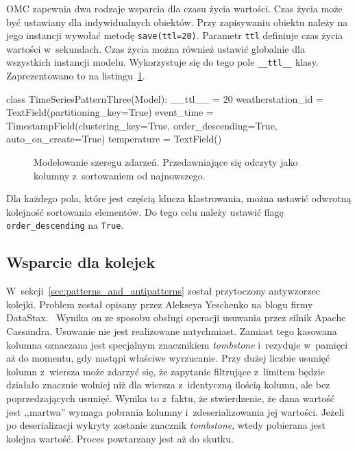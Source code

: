 OMC zapewnia dwa rodzaje wsparcia dla czasu życia wartości. Czas życia może być ustawiany dla indywidualnych obiektów. Przy zapisywaniu obiektu należy na jego instancji wywołać metodę \verb+save(ttl=20)+. Parametr \verb+ttl+ definiuje czas życia wartości w~sekundach. Czas życia można również ustawić globalnie dla wszystkich instancji modelu. Wykorzystuje się do tego pole \verb+__ttl__+ klasy. Zaprezentowano to na listingu~\ref{lst:time_series_modeling_three}.

\begin{verbbox}[\footnotesize]
class TimeSeriesPatternThree(Model):
    __ttl__ = 20
    weatherstation_id = TextField(partitioning_key=True)
    event_time = TimestampField(clustering_key=True, 
                                order_descending=True,
                                auto_on_create=True)
    temperature = TextField()
\end{verbbox}

\begin{figure}[ht!]
	\centering
	\theverbbox
	\caption{Modelowanie szeregu zdarzeń. Przedawniające się odczyty jako kolumny z~sortowaniem od najnowszego.}
	\label{lst:time_series_modeling_three}
\end{figure} 

Dla każdego pola, które jest częścią klucza klastrowania, można ustawić odwrotną kolejność sortowania elementów. Do tego celu należy ustawić flagę \verb+order_descending+ na \verb+True+.

\subsection{Wsparcie dla kolejek}

W~sekcji~\ref{sec:patterns_and_antipatterns} został przytoczony antywzorzec kolejki. Problem został opisany przez Alekseya Yeschenko na blogu firmy DataStax.~\cite{cassandra_queue_antipattern} Wynika on ze sposobu obsługi operacji usuwania przez silnik Apache Cassandra. Usuwanie nie jest realizowane natychmiast. Zamiast tego kasowana kolumna oznaczana jest specjalnym znacznikiem \emph{tombstone} i~rezyduje w~pamięci aż do momentu, gdy nastąpi właściwe wyrzucanie. Przy dużej liczbie usunięć kolumn z~wiersza może zdarzyć się, że zapytanie filtrujące z~limitem będzie działało znacznie wolniej niż dla wiersza z~identyczną ilością kolumn, ale bez poprzedzających usunięć. Wynika to z~faktu, że stwierdzenie, że dana wartość jest ,,martwa'' wymaga pobrania kolumny i~zdeserializowania jej wartości. Jeżeli po deserializacji wykryty zostanie znacznik \emph{tombstone}, wtedy pobierana jest kolejna wartość. Proces powtarzany jest aż do skutku.

